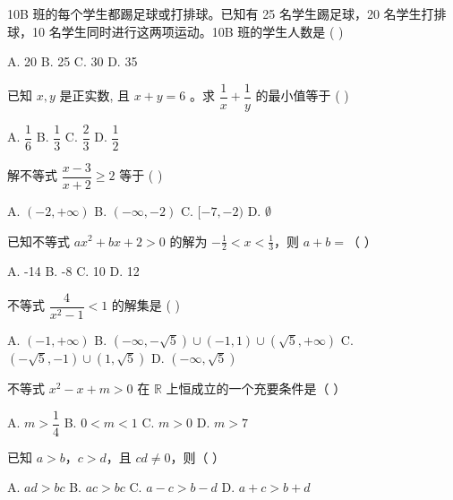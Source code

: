 \documentclass[11pt, a4paper]{article}
\begin{document}
\begin{baitap}[18]
10B 班的每个学生都踢足球或打排球。已知有 25 名学生踢足球，20 名学生打排球，10 名学生同时进行这两项运动。10B 班的学生人数是 ( )
\par\vspace{3pt}
\noindent A. 20 \quad B. 25 \quad C. 30 \quad D. 35
\end{baitap}

\begin{baitap}[19]
已知 $x, y$ 是正实数, 且 $x + y = 6$ 。求 $\dfrac{1}{x} + \dfrac{1}{y}$ 的最小值等于 ( )
\par\vspace{3pt}
\noindent A. $\dfrac{1}{6}$ \quad B. $\dfrac{1}{3}$ \quad C. $\dfrac{2}{3}$ \quad D. $\dfrac{1}{2}$
\end{baitap}

\begin{baitap}[20]
解不等式 $\dfrac{x-3}{x+2} \ge 2$ 等于 ( )
\par\vspace{3pt}
\noindent A. $(-2, +\infty)$ \quad B. $(-\infty, -2)$ \quad C. $[-7, -2)$ \quad D. $\emptyset$
\end{baitap}

\begin{baitap}[21]
已知不等式 $ax^2+bx+2>0$ 的解为 $-\frac{1}{2}<x<\frac{1}{3}$，则 $a+b=$（ ）
\par\vspace{3pt}
\noindent A. -14 \quad B. -8 \quad C. 10 \quad D. 12
\end{baitap}

\begin{baitap}[22]
不等式 $\dfrac{4}{x^2-1} < 1$ 的解集是 ( )
\par\vspace{3pt}
\noindent A. $(-1, +\infty)$ \quad B. $(-\infty, -\sqrt{5}) \cup (-1,1) \cup (\sqrt{5}, +\infty)$ \quad C. $(-\sqrt{5}, -1) \cup (1, \sqrt{5})$ \quad D. $(-\infty, \sqrt{5})$
\end{baitap}

\begin{baitap}[23]
不等式 $x^2 - x + m > 0$ 在 $\mathbb{R}$ 上恒成立的一个充要条件是（ ）
\par\vspace{3pt}
\noindent A. $m > \dfrac{1}{4}$ \quad B. $0 < m < 1$ \quad C. $m > 0$ \quad D. $m > 7$
\end{baitap}

\begin{baitap}[24]
已知 $a>b$，$c>d$，且 $cd\ne0$，则（ ）
\par\vspace{3pt}
\noindent A. $ad>bc$ \quad B. $ac>bc$ \quad C. $a-c>b-d$ \quad D. $a+c>b+d$
\end{baitap}
\end{document}
